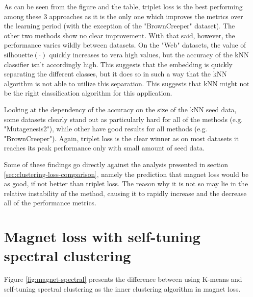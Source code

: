 As can be seen from the figure and the table, triplet loss is the best performing among these 3 approaches as it is the only one which improves the metrics over the learning period (with the exception of the "BrownCreeper" dataset). The other two methods show no clear improvement. With that said, however, the performance varies wildly between datasets. On the "Web" datasets, the value of \( \mathrm{silhouette} \left( \cdot \right) \) quickly increases to vera high values, but the accuracy of the kNN classifier isn't accordingly high. This suggests that the embedding is quickly separating the different classes, but it does so in such a way that the kNN algorithm is not able to utilize this separation. This suggests that kNN might not be the right classification algorithm for this application.

Looking at the dependency of the accuracy on the size of the kNN seed data, some datasets clearly stand out as particularly hard for all of the methods (e.g. "Mutagenesis2"), while other have good results for all methods (e.g. "BrownCreeper"). Again, triplet loss is the clear winner as on most datasets it reaches its peak performance only with small amount of seed data.

Some of these findings go directly against the analysis presented in section \ref{sec:clustering-loss-comparison}, namely the prediction that magnet loss would be as good, if not better than triplet loss. The reason why it is not so may lie in the relative instability of the method, causing it to rapidly increase and the decrease all of the performance metrics.

\section{Magnet loss with self-tuning spectral clustering}\label{sec:magnet-spectral}

Figure \ref{fig:magnet-spectral} presents the difference between using K-means and self-tuning spectral clustering as the inner clustering algorithm in magnet loss.

